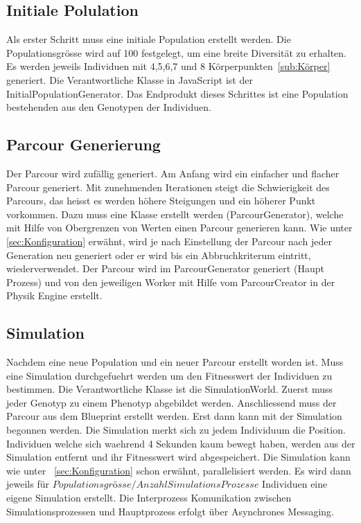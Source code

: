     \subsection{Initiale Polulation\label{sec:Initiale Polulation}}

      Als erster Schritt muss eine initiale Population erstellt werden. Die Populationsgrösse wird auf 100 festgelegt,
      um eine breite Diversität zu erhalten.
      Es werden jeweils Individuen mit 4,5,6,7 und 8 Körperpunkten~\ref{sub:Körper} generiert.
      Die Verantwortliche Klasse in JavaScript ist der InitialPopulationGenerator.
      Das Endprodukt dieses Schrittes ist eine Population bestehenden aus den Genotypen der Individuen.

    \subsection{Parcour Generierung\label{sec:Parcour Generierung}}

      Der Parcour wird zufällig generiert. Am Anfang wird ein einfacher und flacher Parcour generiert.
      Mit zunehmenden Iterationen steigt die Schwierigkeit des Parcours, das heisst es werden höhere Steigungen und ein höherer Punkt vorkommen.
      Dazu muss eine Klasse erstellt werden (ParcourGenerator), welche mit Hilfe von Obergrenzen von Werten einen Parcour generieren kann.
      Wie unter \ref{sec:Konfiguration} erwähnt, wird je nach Einstellung der Parcour nach jeder Generation neu generiert oder er wird bis ein Abbruchkriterum
      eintritt, wiederverwendet. Der Parcour wird im ParcourGenerator generiert (Haupt Prozess) und von den jeweiligen Worker mit Hilfe vom ParcourCreator in der Physik Engine erstellt.

    \subsection{Simulation}
      Nachdem eine neue Population und ein neuer Parcour erstellt worden ist.
      Muss eine Simulation durchgefuehrt werden um den Fitnesswert der Individuen zu bestimmen.
      Die Verantwortliche Klasse ist die SimulationWorld. Zuerst muss jeder Genotyp zu einem Phenotyp abgebildet werden.
      Anschliessend muss der Parcour aus dem Blueprint erstellt werden. Erst dann kann mit der Simulation begonnen werden.
      Die Simulation merkt sich zu jedem Individuum die Position. Individuen welche sich waehrend 4 Sekunden kaum bewegt haben,
      werden aus der Simulation entfernt und ihr Fitnesswert wird abgespeichert.
      Die Simulation kann wie unter ~\ref{sec:Konfiguration} schon erwähnt, parallelisiert werden. Es wird dann jeweils für
      \( Populationsgrösse / Anzahl Simulations Prozesse \) Individuen eine eigene Simulation erstellt. Die Interprozess Komunikation
      zwischen Simulationsprozessen und Hauptprozess erfolgt über Asynchrones Messaging.

